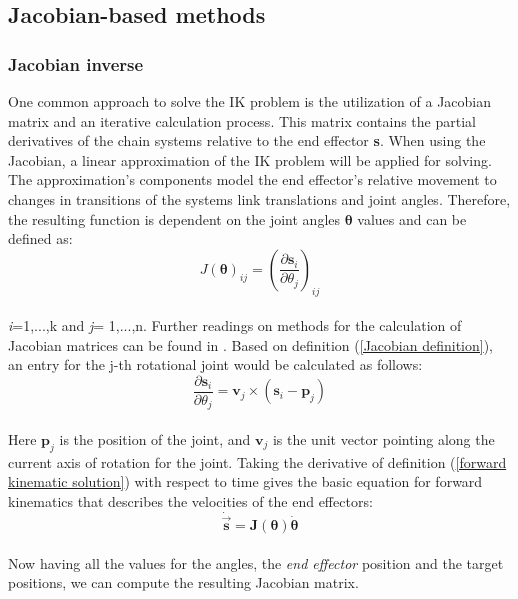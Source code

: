\subsection{Jacobian-based methods}
\subsubsection{Jacobian inverse}
One common approach to solve the IK problem is the utilization of a Jacobian matrix and an iterative calculation process. This matrix contains the partial derivatives of the chain systems relative to the end effector \textbf{s}. When using the Jacobian, a linear approximation  of the IK problem will be applied for solving. The approximation's components model the end effector's relative movement to changes in transitions of the systems link translations and joint angles. Therefore, the resulting function is dependent on the joint angles $\pmb{\theta}$ values and can be defined as:\\
\begin{equation}
\label{Jacobian definition}
J(\pmb{\theta})_{ij}=\left(\frac{\partial\textbf{s}_{i}}{\partial\theta_{j}}\right)_{ij}
\end{equation}
\\ \textit{i}=1,...,k and \textit{j}= 1,...,n.
Further readings on methods for the calculation of Jacobian matrices can be found in \cite{Orin.1984}. Based on definition (\ref{Jacobian definition}), an entry for the j-th rotational joint would be calculated as follows:\\
\begin{equation}
\label{Jacobian entry calc}
\frac{\partial \textbf{s}_{i}}{\partial \theta_{j}}= \textbf{v}_{j}\times(\textbf{s}_{i}-\textbf{p}_{j})
\end{equation}
\\Here $\textbf{p}_{j}$ is the position of the joint, and $\textbf{v}_{j}$ is the unit vector pointing along the current axis of rotation for the joint.
Taking the derivative of definition (\ref{forward kinematic solution}) with respect to time gives the basic equation for forward kinematics that describes the velocities of the end effectors:
\begin{equation}
\label{fk derivate}
\dot{\vec{\pmb{s}}}=\pmb{J}\pmb{(\theta)}\dot{\pmb{\theta}}
\end{equation}
\\ Now having all the values for the angles, the \textit{end effector} position and the target positions, we can compute the resulting Jacobian matrix.

